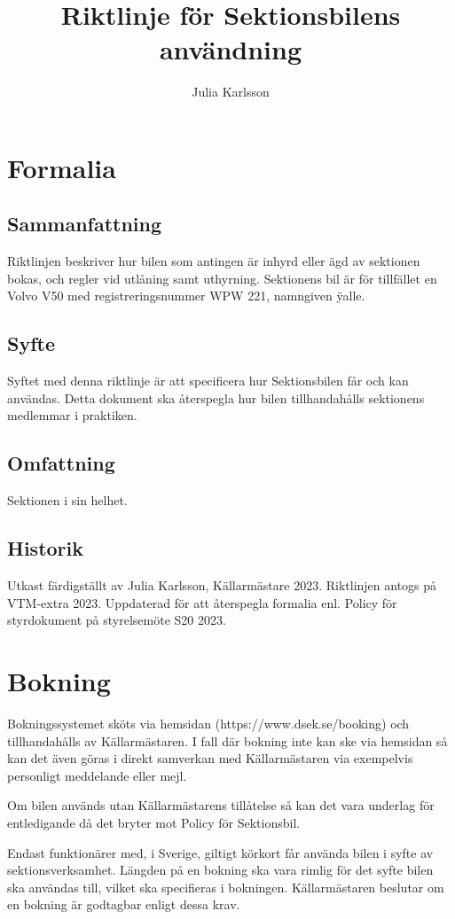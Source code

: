 \documentclass{dsekprotokoll}
\author{Julia Karlsson}
\title{Riktlinje för Sektionsbilens användning}
\begin{document}
\maketitle
\section{Formalia}
\subsection{Sammanfattning}
Riktlinjen beskriver hur bilen som antingen är inhyrd eller ägd av sektionen bokas, och regler vid utlåning samt uthyrning. Sektionens bil är för tillfället en Volvo V50 med registreringsnummer WPW 221, namngiven \"yalle.

\subsection{Syfte}
Syftet med denna riktlinje är att specificera hur Sektionsbilen får och kan användas. Detta dokument ska återspegla hur bilen tillhandahålls sektionens medlemmar i praktiken.

\subsection{Omfattning}
Sektionen i sin helhet.

\subsection{Historik}
Utkast färdigställt av Julia Karlsson, Källarmästare 2023. Riktlinjen antogs på VTM-extra 2023.
Uppdaterad för att återspegla formalia enl. Policy för styrdokument på styrelsemöte S20 2023.

\section{Bokning}
Bokningssystemet sköts via hemsidan (https://www.dsek.se/booking) och tillhandahålls av Källarmästaren. I fall där bokning inte kan ske via hemsidan så kan det även göras i direkt samverkan med Källarmästaren via exempelvis personligt meddelande eller mejl. 

Om bilen används utan Källarmästarens tillåtelse så kan det vara underlag för entledigande då det bryter mot Policy för Sektionsbil. 

Endast funktionärer med, i Sverige, giltigt körkort får använda bilen i syfte av sektionsverksamhet. Längden på en bokning ska vara rimlig för det syfte bilen ska användas till, vilket ska specifieras i bokningen. Källarmästaren beslutar om en bokning är godtagbar enligt dessa krav.
\end{document}
